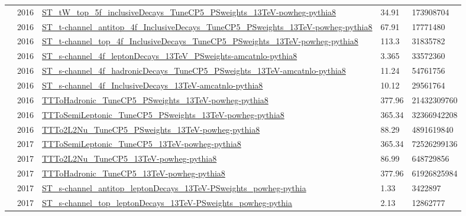 \begin{table}
{\begin{tabular}{lllll}
              & 2016 & \url{ST_tW_top_5f_inclusiveDecays_TuneCP5_PSweights_13TeV-powheg-pythia8}            & 34.91              & 173908704        \\
              & 2016 & \url{ST_t-channel_antitop_4f_InclusiveDecays_TuneCP5_PSweights_13TeV-powheg-pythia8} & 67.91              & 17771480         \\
              & 2016 & \url{ST_t-channel_top_4f_InclusiveDecays_TuneCP5_PSweights_13TeV-powheg-pythia8}     & 113.3              & 31835782         \\
              & 2016 & \url{ST_s-channel_4f_leptonDecays_13TeV_PSweights-amcatnlo-pythia8}                  & 3.365              & 33572360         \\
              & 2016 & \url{ST_s-channel_4f_hadronicDecays_TuneCP5_PSweights_13TeV-amcatnlo-pythia8}        & 11.24              & 54761756         \\
              & 2016 & \url{ST_s-channel_4f_InclusiveDecays_13TeV-amcatnlo-pythia8}                         & 10.12              & 29561764         \\
              & 2016 & \url{TTToHadronic_TuneCP5_PSweights_13TeV-powheg-pythia8}                            & 377.96             & 21432309760      \\
              & 2016 & \url{TTToSemiLeptonic_TuneCP5_PSweights_13TeV-powheg-pythia8}                        & 365.34             & 32366942208      \\
              & 2016 & \url{TTTo2L2Nu_TuneCP5_PSweights_13TeV-powheg-pythia8}                               & 88.29              & 4891619840       \\
      \cmidrule(lr){2-5}
              & 2017 & \url{TTToSemiLeptonic_TuneCP5_13TeV-powheg-pythia8}                                  & 365.34             & 72526299136      \\
              & 2017 & \url{TTTo2L2Nu_TuneCP5_13TeV-powheg-pythia8}                                         & 86.99              & 648729856        \\
              & 2017 & \url{TTToHadronic_TuneCP5_13TeV-powheg-pythia8}                                      & 377.96             & 61926825984      \\
              & 2017 & \url{ST_s-channel_antitop_leptonDecays_13TeV-PSweights_powheg-pythia}                & 1.33               & 3422897          \\
              & 2017 & \url{ST_s-channel_top_leptonDecays_13TeV-PSweights_powheg-pythia}                    & 2.13               & 12862777         \\

\end{tabular}}
\end{table}
